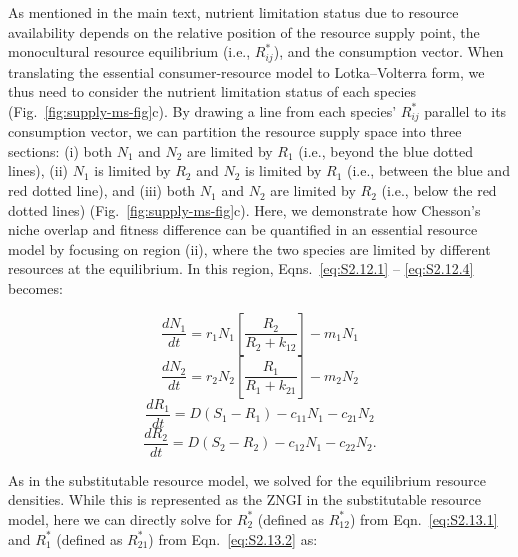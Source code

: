 \noindent As mentioned in the main text, nutrient limitation status due to resource availability depends on the relative position of the resource supply point, the monocultural resource equilibrium (i.e., $R_{ij}^{*}$), and the consumption vector. When translating the essential consumer-resource model to Lotka--Volterra form, we thus need to consider the nutrient limitation status of each species (Fig.~\ref{fig:supply-ms-fig}c). By drawing a line from each species' $R_{ij}^{*}$ parallel to its consumption vector, we can partition the resource supply space into three sections: (i) both $N_{1}$ and $N_{2}$ are limited by $R_{1}$ (i.e., beyond the blue dotted lines), (ii) $N_{1}$ is limited by $R_{2}$ and $N_{2}$ is limited by $R_{1}$ (i.e., between the blue and red dotted line), and (iii) both $N_{1}$ and $N_{2}$ are limited by $R_{2}$ (i.e., below the red dotted lines) (Fig.~\ref{fig:supply-ms-fig}c). Here, we demonstrate how Chesson's niche overlap and fitness difference can be quantified in an essential resource model by focusing on region (ii), where the two species are limited by different resources at the equilibrium. In this region, Eqns.~\ref{eq:S2.12.1} -- \ref{eq:S2.12.4} becomes:

\begin{equation}
\frac{{d{N_1}}}{{dt}} = {r_1}{N_1} \left[{\frac{{{R_2}}}{{{R_2} + {k_{12}}}}} \right] - {m_1}{N_1}
\tag{S2.13.1}\label{eq:S2.13.1}
\end{equation}
\begin{equation}
\frac{{d{N_2}}}{{dt}} = {r_2}{N_2} \left[{\frac{{{R_1}}}{{{R_1} + {k_{21}}}}} \right] - {m_2}{N_2}
\tag{S2.13.2}\label{eq:S2.13.2}
\end{equation}
\begin{equation}
\frac{{d{R_1}}}{{dt}} = D\left( {{S_1} - {R_1}} \right) - {c_{11}}{N_{1}} - {c_{21}}{N_{2}}
\tag{S2.13.3}\label{eq:S2.13.3}
\end{equation}
\begin{equation}
\frac{{d{R_2}}}{{dt}} = D\left( {{S_2} - {R_2}} \right) - {c_{12}}{N_{1}} - {c_{22}}{N_{2}}.
\tag{S2.13.4}\label{eq:S2.13.4}
\end{equation}

As in the substitutable resource model, we solved for the equilibrium resource densities. While this is represented as the ZNGI in the substitutable resource model, here we can directly solve for $R_{2}^{*}$ (defined as $R_{12}^{*}$) from Eqn.~\ref{eq:S2.13.1} and $R_{1}^{*}$ (defined as $R_{21}^{*}$) from Eqn.~\ref{eq:S2.13.2} as:

